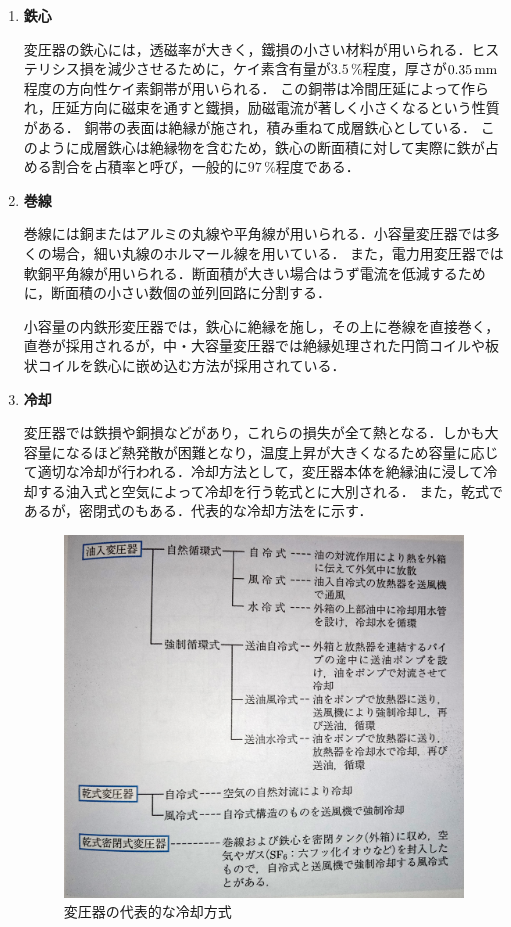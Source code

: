\begin{enumerate}
	\item \textbf{鉄心}
	
	変圧器の鉄心には，透磁率が大きく，鐵損の小さい材料が用いられる．ヒステリシス損を減少させるために，ケイ素含有量が$3.5\,\%$程度，厚さが$0.35\,\rm{mm}$程度の方向性ケイ素銅帯が用いられる．
	この銅帯は冷間圧延によって作られ，圧延方向に磁束を通すと鐵損，励磁電流が著しく小さくなるという性質がある．
	銅帯の表面は絶縁が施され，積み重ねて成層鉄心としている．
	このように成層鉄心は絶縁物を含むため，鉄心の断面積に対して実際に鉄が占める割合を占積率と呼び，一般的に$97\,\%$程度である．
	\item \textbf{巻線}
	
	巻線には銅またはアルミの丸線や平角線が用いられる．小容量変圧器では多くの場合，細い丸線のホルマール線を用いている．
	また，電力用変圧器では軟銅平角線が用いられる．断面積が大きい場合はうず電流を低減するために，断面積の小さい数個の並列回路に分割する．
	
	小容量の内鉄形変圧器では，鉄心に絶縁を施し，その上に巻線を直接巻く，直巻が採用されるが，中・大容量変圧器では絶縁処理された円筒コイルや板状コイルを鉄心に嵌め込む方法が採用されている．
	\item \textbf{冷却}
	
	変圧器では鉄損や銅損などがあり，これらの損失が全て熱となる．しかも大容量になるほど熱発散が困難となり，温度上昇が大きくなるため容量に応じて適切な冷却が行われる．冷却方法として，変圧器本体を絶縁油に浸して冷却する油入式と空気によって冷却を行う乾式とに大別される．
	また，乾式であるが，密閉式のもある．代表的な冷却方法をに示す．
	\begin{figure}[h]
	\centering
	\includegraphics[scale=0.45]{./fig/kind.pdf}
	\caption{変圧器の代表的な冷却方式\cite{jdksff}}
	\label{fig:cool}
\end{figure}
\end{enumerate}

